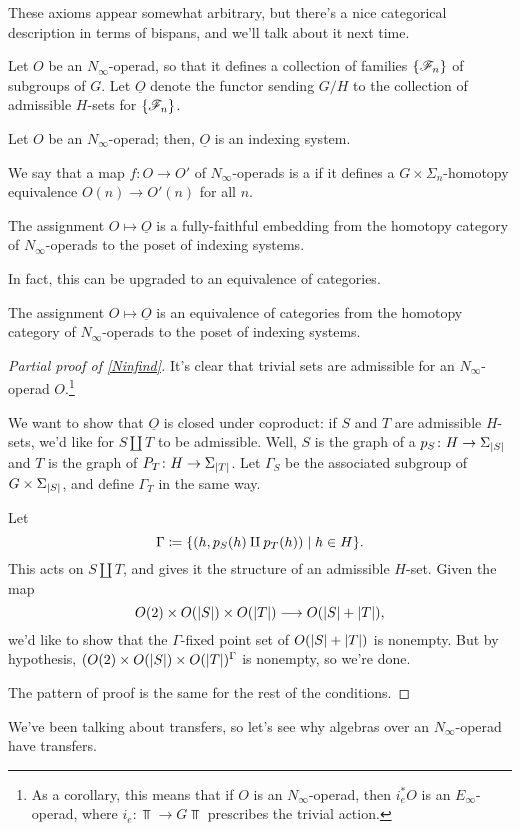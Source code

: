 These axioms appear somewhat arbitrary, but there's a nice categorical description in terms of bispans, and we'll
talk about it next time.
\begin{defn}
Let $O$ be an $N_\infty$-operad, so that it defines a collection of families $\{\mathscr F_n\}$ of subgroups of $G$.
Let $\underline O$ denote the functor sending $G/H$ to the collection of admissible $H$-sets for $\{\mathscr F_n\}$.
\end{defn}
\begin{prop}
\label{Ninfind}
Let $O$ be an $N_\infty$-operad; then, $\underline O$ is an indexing system.
\end{prop}
We say that a map $f\colon O\to O'$ of $N_\infty$-operads is a  if it defines a
$G\times\Sigma_n$-homotopy equivalence $O(n)\to O'(n)$ for all $n$.
\begin{thm}
The assignment $O\mapsto\underline O$ is a fully-faithful embedding from the homotopy category of
$N_\infty$-operads to the poset of indexing systems.
\end{thm}
In fact, this can be upgraded to an equivalence of categories.
\begin{thm}
The assignment $O\mapsto\underline O$ is an equivalence of categories from the homotopy category of
$N_\infty$-operads to the poset of indexing systems.
\end{thm}
\begin{proof}[Partial proof of \cref{Ninfind}]
It's clear that trivial sets are admissible for an $N_\infty$-operad $O$.\footnote{As a corollary, this means that
if $O$ is an $N_\infty$-operad, then $i_e^*O$ is an $E_\infty$-operad, where $i_e\colon\Top\to G\Top$ prescribes
the trivial action.}

We want to show that $\underline O$ is closed under coproduct: if $S$ and $T$ are admissible $H$-sets, we'd like
for $S\amalg T$ to be admissible. Well, $S$ is the graph of a $p_S\colon H\to\Sigma_{\lvert S\rvert}$ and $T$ is the graph
of $P_T\colon H\to\Sigma_{\lvert T\rvert}$. Let $\Gamma_S$ be the associated subgroup of $G\times\Sigma_{\lvert S\rvert}$, and
define $\Gamma_T$ in the same way.

Let
\[\Gamma\coloneqq \{(h, p_S(h)\amalg p_T(h))\mid h\in H\}.\]
This acts on $S\amalg T$, and gives it the structure of an admissible $H$-set. Given the map
\[O(2)\times O(\lvert S\rvert)\times O(\lvert T\rvert)\longrightarrow O(\lvert S\rvert + \lvert T\rvert),\]
we'd like to show that the $\Gamma$-fixed point set of $O(\lvert S\rvert + \lvert T\rvert)$ is nonempty. But by hypothesis,
$(O(2)\times O(\lvert S\rvert)\times O(\lvert T\rvert)^\Gamma$ is nonempty, so we're done.

The pattern of proof is the same for the rest of the conditions.
\end{proof}
We've been talking about transfers, so let's see why algebras over an $N_\infty$-operad have transfers.

